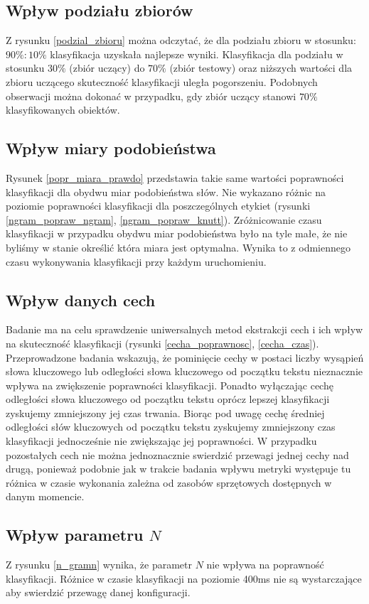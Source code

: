 \documentclass{classrep}
\begin{document}
\subsection{Wpływ podziału zbiorów}
Z rysunku \ref{podzial_zbioru} można odczytać, że dla podziału zbioru w stosunku: $90\%:10\%$ klasyfikacja
uzyskała najlepsze wyniki.
Klasyfikacja dla podziału w stosunku $30\%$ (zbiór uczący) do $70\%$ (zbiór testowy) oraz niższych wartości dla zbioru uczącego
skuteczność klasyfikacji uległa pogorszeniu. Podobnych obserwacji można dokonać w przypadku, gdy
zbiór uczący stanowi $70\%$
klasyfikowanych obiektów.

\subsection{Wpływ miary podobieństwa}
Rysunek \ref{popr_miara_prawdo} przedstawia takie same wartości poprawności klasyfikacji dla obydwu
miar podobieństwa słów. Nie wykazano różnic na poziomie poprawności klasyfikacji dla poszczególnych
etykiet (rysunki \ref{ngram_popraw_ngram}, \ref{ngram_popraw_knutt}). Zróżnicowanie czasu klasyfikacji
w przypadku obydwu miar podobieństwa było na tyle małe, że nie byliśmy w stanie określić która
miara jest optymalna. Wynika to z odmiennego czasu wykonywania klasyfikacji przy każdym uruchomieniu.

\subsection{Wpływ danych cech}
Badanie ma na celu sprawdzenie uniwersalnych metod ekstrakcji cech i ich wpływ na skuteczność
klasyfikacji (rysunki \ref{cecha_poprawnosc}, \ref{cecha_czas}). Przeprowadzone badania wskazują,
że pominięcie cechy w postaci liczby wysąpień słowa kluczowego lub odległości słowa kluczowego od początku tekstu
nieznacznie wpływa na zwiększenie poprawności klasyfikacji. Ponadto wyłączając cechę odległości słowa
kluczowego od początku tekstu oprócz lepszej klasyfikacji zyskujemy zmniejszony jej czas trwania.
Biorąc pod uwagę cechę średniej odległości słów kluczowych od początku tekstu zyskujemy zmniejszony
czas klasyfikacji jednocześnie nie zwiększając jej poprawności. W przypadku pozostałych cech nie można
jednoznacznie swierdzić przewagi jednej cechy nad drugą, ponieważ podobnie jak w trakcie badania wpływu
metryki występuje tu różnica w czasie wykonania zależna od zasobów sprzętowych dostępnych w danym momencie.

\subsection{Wpływ parametru $N$}
Z rysunku \ref{n_gramn} wynika, że parametr $N$ nie wpływa na poprawność klasyfikacji. Różnice w czasie klasyfikacji
na poziomie 400ms nie są wystarczające aby swierdzić przewagę danej konfiguracji.
\end{document}
